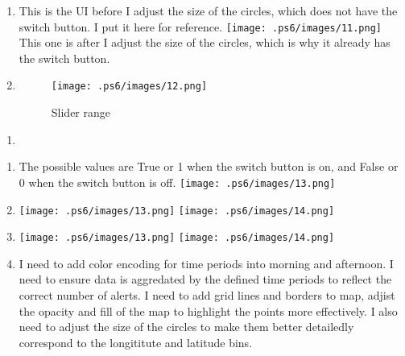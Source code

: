 \documentclass[
  letterpaper,
  DIV=11,
  numbers=noendperiod]{scrartcl}
\providecommand{\tightlist}{%
  \setlength{\itemsep}{0pt}\setlength{\parskip}{0pt}}\usepackage{longtable,booktabs,array}
\begin{document}
\begin{enumerate}
\def\labelenumi{\alph{enumi}.}
\item
  This is the UI before I adjust the size of the circles, which does not
  have the switch button. I put it here for reference.
  \texttt{[image: .ps6/images/11.png]} This one is after I adjust the
  size of the circles, which is why it already has the switch button.
\item
  \begin{figure}[H]

  {\centering \texttt{[image: .ps6/images/12.png]}

  }

  \caption{Slider range}

  \end{figure}%
\end{enumerate}

\begin{enumerate}
\def\labelenumi{\arabic{enumi}.}
\setcounter{enumi}{2}
\tightlist
\item
\end{enumerate}

\begin{enumerate}
\def\labelenumi{\alph{enumi}.}
\item
  The possible values are True or 1 when the switch button is on, and
  False or 0 when the switch button is off.
  \texttt{[image: .ps6/images/13.png]}
\item
  \texttt{[image: .ps6/images/13.png]}
  \texttt{[image: .ps6/images/14.png]}
\item
  \texttt{[image: .ps6/images/13.png]}
  \texttt{[image: .ps6/images/14.png]}
\item
  I need to add color encoding for time periods into morning and
  afternoon. I need to ensure data is aggredated by the defined time
  periods to reflect the correct number of alerts. I need to add grid
  lines and borders to map, adjist the opacity and fill of the map to
  highlight the points more effectively. I also need to adjust the size
  of the circles to make them better detailedly correspond to the
  longititute and latitude bins.
\end{enumerate}
\end{document}

